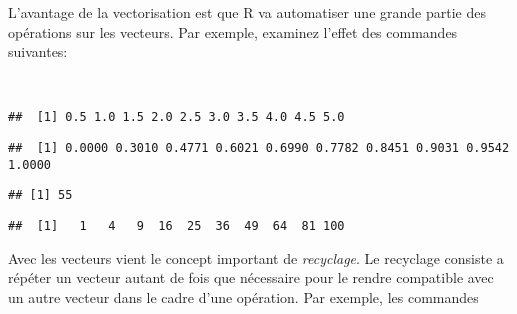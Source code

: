 L'avantage de la vectorisation est que R va automatiser une grande partie des opérations sur les vecteurs.
Par exemple, examinez l'effet des commandes suivantes:

\begin{knitrout}
\color{fgcolor}\begin{kframe}
\begin{flushleft}
\ttfamily\noindent
{}\hlassignement{\usebox{\hlnormalsizeboxlessthan}-}{\ }\hlkeyword{(}\hlkeyword{:}\hlkeyword{)}\hspace*{\fill}\\
\hlstd{}\hlkeyword{/}\mbox{}
\normalfont
\end{flushleft}
\begin{verbatim}
##  [1] 0.5 1.0 1.5 2.0 2.5 3.0 3.5 4.0 4.5 5.0
\end{verbatim}
\begin{flushleft}
\ttfamily\noindent
{}\hlkeyword{(}\hlkeyword{,}{\ }\hlkeyword{)}\mbox{}
\normalfont
\end{flushleft}
\begin{verbatim}
##  [1] 0.0000 0.3010 0.4771 0.6021 0.6990 0.7782 0.8451 0.9031 0.9542 1.0000
\end{verbatim}
\begin{flushleft}
\ttfamily\noindent
{}\hlkeyword{(}\hlkeyword{)}\mbox{}
\normalfont
\end{flushleft}
\begin{verbatim}
## [1] 55
\end{verbatim}
\begin{flushleft}
\ttfamily\noindent
{}\hlkeyword{*}{\ }\mbox{}
\normalfont
\end{flushleft}
\begin{verbatim}
##  [1]   1   4   9  16  25  36  49  64  81 100
\end{verbatim}
\end{kframe}
\end{knitrout}


Avec les vecteurs vient le concept important de \emph{recyclage}.
Le recyclage consiste a répéter un vecteur autant de fois que nécessaire pour le rendre compatible avec un autre vecteur dans le cadre d'une opération.
Par exemple, les commandes

